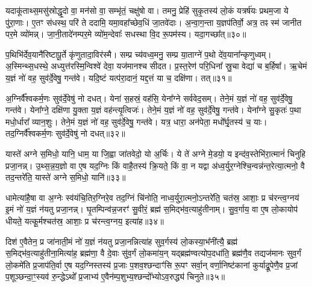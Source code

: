 {\anuvakamend[{पृ॒थि॒वीं य॑च्छ॒ यथ्स्व॑यमातृ॒ण्णा उ॑प॒धाय॑ धेह्यृ॒चाग्निश्चि॑नु॒ते त्रीणि॑ च॥७॥}]}

यदाकू॑ताथ्स॒मसु॑स्रोद्धृ॒दो वा॒ मन॑सो वा॒ सम्भृ॑तं॒ चक्षु॑षो वा। तमनु॒ प्रेहि॑ सुकृ॒तस्य॑ लो॒कं यत्रर्\mbox{}ष॑यः प्रथम॒जा ये पु॑रा॒णाः। ए॒तꣳ स॑धस्थ॒ परि॑ ते ददामि॒ यमा॒वहा᳚च्छेव॒धिं जा॒तवे॑दाः। अ॒न्वा॒ग॒न्ता य॒ज्ञप॑तिर्वो॒ अत्र॒ तꣴ स्म॑ जानीत पर॒मे व्यो॑मन्न्। जा॒नी॒तादे॑नम्पर॒मे व्यो॑म॒न्देवाः᳚ सधस्था वि॒द रू॒पम॑स्य। यदा॒गच्छा᳚त्॥३०॥

प॒थिभि॑र्देव॒यानै॑रिष्टापू॒र्ते कृ॑णुतादा॒विर॑स्मै। सम्प्र च्य॑वध्व॒मनु॒ सम्प्र या॒ताग्ने॑ प॒थो दे॑व॒याना᳚न्कृणुध्वम्। अ॒स्मिन्थ्स॒धस्थे॒ अध्युत्त॑रस्मि॒न्विश्वे॑ देवा॒ यज॑मानश्च सीदत। प्र॒स्त॒रेण॑ परि॒धिना᳚ स्रु॒चा वेद्या॑ च ब॒र्\mbox{}हिषा᳚। ऋ॒चेमं य॒ज्ञं नो॑ वह॒ सुव॑र्दे॒वेषु॒ गन्त॑वे। यदि॒ष्टं यत्प॑रा॒दानं॒ यद्द॒त्तं या च॒ दक्षि॑णा। तत्॥३१॥

अ॒ग्निर्वै᳚श्वकर्म॒णः सुव॑र्दे॒वेषु॑ नो दधत्। येना॑ स॒हस्रं॒ वह॑सि॒ येना᳚ग्ने सर्ववेद॒सम्। तेने॒मं य॒ज्ञं नो॑ वह॒ सुव॑र्दे॒वेषु॒ गन्त॑वे। येना᳚ग्ने॒ दक्षि॑णा यु॒क्ता य॒ज्ञं वह॑न्त्यृ॒त्विजः॑। तेने॒मं य॒ज्ञं नो॑ वह॒ सुव॑र्दे॒वेषु॒ गन्त॑वे। येना᳚ग्ने सु॒कृतः॑ प॒था मधो॒र्धारा᳚ व्यान॒शुः। तेने॒मं य॒ज्ञं नो॑ वह॒ सुव॑र्दे॒वेषु॒ गन्त॑वे। यत्र॒ धारा॒ अन॑पेता॒ मधो᳚र्घृ॒तस्य॑ च॒ याः। तद॒ग्निर्वै᳚श्वकर्म॒णः सुव॑र्दे॒वेषु॑ नो दधत्॥३२॥

{\anuvakamend[{आ॒गच्छा॒त्तद्व्या॑न॒शुस्तेने॒मं य॒ज्ञं नो॑ वह॒ सुव॑र्दे॒वेषु॒ गन्त॑वे॒ चतु॑र्दश च॥७॥}]}

यास्ते॑ अग्ने स॒मिधो॒ यानि॒ धाम॒ या जि॒ह्वा जा॑तवेदो॒ यो अ॒र्चिः। ये ते॑ अग्ने मे॒डयो॒ य इन्द॑व॒स्तेभि॑रा॒त्मानं॑ चिनुहि प्रजा॒नन्न्। उ॒थ्स॒न्न॒य॒ज्ञो वा ए॒ष यद॒ग्निः किं वाहै॒तस्य॑ क्रि॒यते॒ किं वा॒ न यद्वा अ॑ध्व॒र्युर॒ग्नेश्चि॒न्वन्न॑न्त॒रेत्या॒त्मनो॒ वै तद॒न्तरे॑ति॒ यास्ते॑ अग्ने स॒मिधो॒ यानि॑॥३३॥

धामेत्या॑है॒षा वा अ॒ग्नेः स्व॑यंचि॒तिर॒ग्निरे॒व तद॒ग्निं चि॑नोति॒ नाध्व॒र्युरा॒त्मनो॒\-ऽन्तरे॑ति॒ चत॑स्र॒ आशाः॒ प्र च॑रन्त्व॒ग्नय॑ इ॒मं नो॑ य॒ज्ञं न॑यतु प्रजा॒नन्न्। घृ॒तम्पिन्व॑न्न॒जरꣳ॑ सु॒वीरं॒ ब्रह्म॑ स॒मिद्भ॑व॒त्याहु॑तीनाम्। सु॒व॒र्गाय॒ वा ए॒ष लो॒कायोप॑ धीयते॒ यत्कू॒र्मश्चत॑स्र॒ आशाः॒ प्र च॑रन्त्व॒ग्नय॒ इत्या॑ह॥३४॥

दिश॑ ए॒वैतेन॒ प्र जा॑नाती॒मं नो॑ य॒ज्ञं न॑यतु प्रजा॒नन्नित्या॑ह सुव॒र्गस्य॑ लो॒कस्या॒भ᳚नी॑त्यै॒ ब्रह्म॑ स॒मिद्भ॑व॒त्याहु॑तीना॒मित्या॑ह॒ ब्रह्म॑णा॒ वै दे॒वाः सु॑व॒र्गं लो॒कमा॑य॒न् यद्ब्रह्म॑ण्वत्योप॒दधा॑ति॒ ब्रह्म॑णै॒व तद्यज॑मानः सुव॒र्गं लो॒कमे॑ति प्र॒जाप॑ति॒र्वा ए॒ष यद॒ग्निस्तस्य॑ प्र॒जाः प॒शव॒श्छन्दाꣳ॑सि रू॒पꣳ सर्वा॒न् वर्णा॒निष्ट॑कानां कुर्याद्रू॒पेणै॒व प्र॒जां प॒शूञ्छन्दा॒ꣳ॒स्यव॑ रु॒न्द्धे\-ऽथो᳚ प्र॒जाभ्य॑ ए॒वैन॑म्प॒शुभ्य॒श्छन्दो᳚भ्यो\-ऽव॒रुद्ध्य॑ चिनुते॥३५॥

